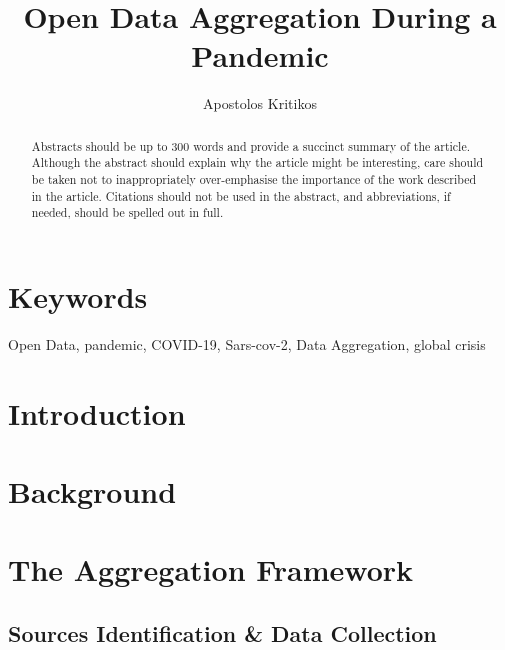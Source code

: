 \documentclass[10pt,a4paper]{article}
\begin{document}
\pagestyle{fancy}

\title{Open Data Aggregation During a Pandemic}
\author[1]{Apostolos Kritikos}

\maketitle
\thispagestyle{fancy}

\begin{abstract}

Abstracts should be up to 300 words and provide a succinct summary of the article. Although the abstract should explain why the article might be interesting, care should be taken not to inappropriately over-emphasise the importance of the work described in the article. Citations should not be used in the abstract, and abbreviations, if needed, should be spelled out in full.

\end{abstract}

\section*{\color{OREblue}Keywords}

Open Data, pandemic, COVID-19, Sars-cov-2, Data Aggregation, global crisis

\clearpage
\pagestyle{fancy}

\section*{Introduction}

\section*{Background}

\section*{The Aggregation Framework}

\subsection*{Sources Identification \& Data Collection}
\end{document}
